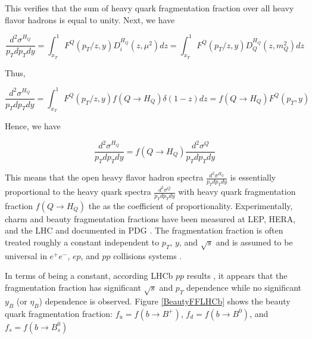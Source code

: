 This verifies that the sum of heavy quark fragmentation fraction over all heavy flavor hadrons is equal to unity. Next, we have 


\begin{equation}
\frac{d^2\sigma^{H_Q}}{p_T dp_T dy} = \int_{x_T}^1 F^Q(p_T/z, y) D_{i}^{H_Q}(z,\mu^2) dz =  \int_{x_T}^1 F^Q(p_T/z, y) D^{H_Q}_{Q}(z,m_Q^2) dz 
\end{equation}

Thus,

\begin{equation}
\frac{d^2\sigma^{H_Q}}{p_T dp_T dy}  = \int_{x_T}^1 F^Q(p_T/z, y) f(Q \rightarrow H_Q) \delta(1 - z) dz =  f(Q \rightarrow H_Q)  F^Q(p_T, y)
\end{equation}

Hence, we have 

\begin{equation}
\frac{d^2\sigma^{H_Q}}{p_T dp_T dy} = f(Q \rightarrow H_Q) \frac{d^2\sigma^{Q}}{p_T dp_T dy}
\end{equation}

This means that the open heavy flavor hadron spectra $\frac{d^2\sigma^{H_Q}}{p_T dp_T dy}$ is essentially proportional to the heavy quark spectra $\frac{d^2\sigma^{Q}}{p_T dp_T dy}$ with heavy quark fragmentation fraction $f(Q \rightarrow H_Q)$ the as the coefficient of proportionality. Experimentally, charm and beauty fragmentation fractions have been measured at LEP, HERA, and the LHC and documented in PDG \cite{AlphaTheoEx}. The fragmentation fraction is often treated roughly a constant independent to $p_T$, $y$, and $\sqrt s$ and is assumed to be universal in $e^+e^-$, $ep$, and $pp$ collisions systems \cite{AlphaTheoEx}. 

In terms of being a constant, according LHCb $pp$ results \cite{LHCbFF}, it appears that the fragmentation fraction has significant $\sqrt s$ and $p_T$ dependence while no significant $y_B$ (or $\eta_B$) dependence is observed. Figure \ref{BeautyFFLHCb} shows the beauty quark fragmentation fraction: $f_u = f(b \rightarrow B^+)$, $f_d = f(b \rightarrow B^0)$, and $f_s = f(b \rightarrow B_s^0)$

